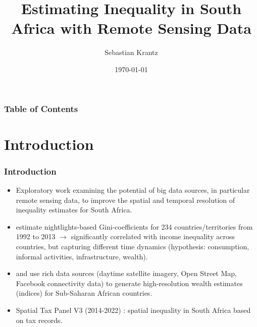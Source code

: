 \documentclass[compress,xcolor=dvipsnames]{beamer}
\title[Remote Sensing Inequality in South Africa]{\textbf{Estimating Inequality in South Africa with Remote Sensing Data}} %
\author{Sebastian Krantz} %
\institute[Kiel Institute for the World Economy]
{
Kiel Institute for the World Economy\\ %
\bigskip
}
\date{\today} %
\newenvironment{noheadline}{
    \setbeamertemplate{headline}{}
    \addtobeamertemplate{frametitle}{\vspace*{-0.9\baselineskip}}{}
}{}
\begin{document}
\begin{noheadline}
\begin{frame} 
\titlepage 
\end{frame}


\begin{frame}
\frametitle{Table of Contents}
\tableofcontents
\end{frame}


\section{Introduction}

\begin{frame}
\frametitle{Introduction}
\begin{itemize}
\item Exploratory work examining the potential of big data sources, in particular remote sensing data, to improve the spatial and temporal resolution of inequality estimates for South Africa. 
\item \citet{galimberti2021measuring} estimate nightlights-based Gini-coefficients for 234 countries/territories from 1992 to 2013 $\to$ significantly correlated with income inequality across countries, but capturing different time dynamics (hypothesis: consumption, informal activities, infrastructure, wealth).
\item \citet{lee2022high} and \citet{chi2022microestimates} use rich data sources (daytime satellite imagery, Open Street Map, Facebook connectivity data) to generate high-resolution wealth estimates (indices) for Sub-Saharan African countries.
\item Spatial Tax Panel V3 (2014-2022) \citep{STP3}: spatial inequality in South Africa based on tax records. 
\end{itemize}
\end{frame}
\end{noheadline}
\end{document}
